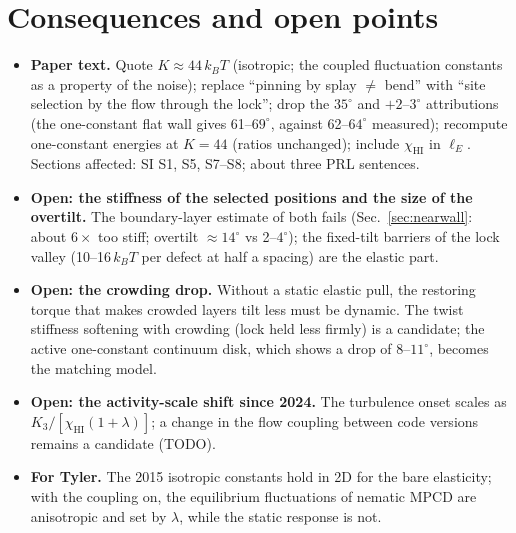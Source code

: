 \documentclass[11pt,a4paper]{article}
\newcommand{\kT}{k_BT}\newcommand{\half}{\tfrac12}\newcommand{\la}{\ell_a}
\begin{document}
\section{Consequences and open points}
\begin{itemize}
\item \textbf{Paper text.} Quote $K\approx44\,\kT$ (isotropic; the coupled fluctuation constants as a property of the noise); replace ``pinning
by splay $\neq$ bend'' with ``site selection by the flow through the lock''; drop the $35^\circ$ and $+2$--$3^\circ$ attributions (the one-constant
flat wall gives 61--$69^\circ$, against 62--$64^\circ$ measured); recompute one-constant energies at $K=44$ (ratios unchanged); include
$\chi_\mathrm{HI}$ in $\ell_E$. Sections affected: SI S1, S5, S7--S8; about three PRL sentences.
\item \textbf{Open: the stiffness of the selected positions and the size of the overtilt.} The boundary-layer estimate of both fails
(Sec.~\ref{sec:nearwall}: about $6\times$ too stiff; overtilt $\approx14^\circ$ vs 2--$4^\circ$); the fixed-tilt barriers of the lock valley (10--16\,$\kT$ per defect at half a
spacing) are the elastic part.
\item \textbf{Open: the crowding drop.} Without a static elastic pull, the restoring torque that makes crowded layers tilt less must be dynamic.
The twist stiffness softening with crowding (lock held less firmly) is a candidate; the active one-constant continuum disk, which shows a drop of
8--$11^\circ$, becomes the matching model.
\item \textbf{Open: the activity-scale shift since 2024.} The turbulence onset scales as $K_3/[\chi_\mathrm{HI}(1+\lambda)]$; a change in the flow
coupling between code versions remains a candidate (TODO).
\item \textbf{For Tyler.} The 2015 isotropic constants hold in 2D for the bare elasticity; with the coupling on, the equilibrium fluctuations
of nematic MPCD are anisotropic and set by $\lambda$, while the static response is not.
\end{itemize}
\end{document}
